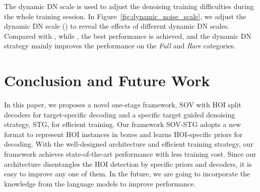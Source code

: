 \documentclass[10pt,twocolumn,letterpaper]{article}
\begin{document}
\quad The dynamic DN scale is used to adjust the denoising training difficulties during the whole training session. 
In Figure~\ref{fig:dynamic_noise_scale}, we adjust the dynamic DN scale () to reveal the effects of different dynamic DN scales.
Compared with , while , the best performance is achieved, and the dynamic DN strategy mainly improves the performance on the \textit{Full} and \textit{Rare} categories.

\section{Conclusion and Future Work}
In this paper, we proposes a novel one-stage framework, SOV with HOI split decoders for target-specific decoding and a specific target guided denoising strategy, STG, for efficient training.
Our framework SOV-STG adopts a new format to represent HOI instances in boxes and learns HOI-specific priors for decoding.
With the well-designed architecture and efficient training strategy, our framework achieves state-of-the-art performance with less training cost.
Since our architecture disentangles the HOI detection by specific priors and decoders, it is easy to improve any one of them.
In the future, we are going to incorporate the knowledge from the language models to improve performance.

{\small


}
\end{document}
